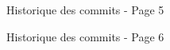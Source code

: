 \documentclass [a4 paper,11pt]{report}
\begin{document}
\begin{center}
  \begin{figure}[h!]
  \noindent{}
  \caption{Historique des commits - Page 5}
  \end{figure}

  \begin{figure}[h!]
  \noindent{}
  \caption{Historique des commits - Page 6}
  \end{figure}

\end{center}

\appendix
\end{document}
